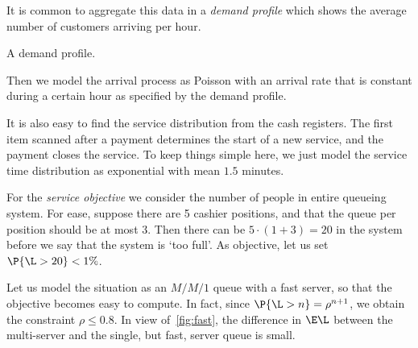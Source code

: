 It is common to aggregate this data in a \emph{demand profile} which shows the average number of customers arriving per hour.
\begin{marginfigure}
\caption{A demand profile.}
\label{fig:loadprofile}
\end{marginfigure}
Then we model the arrival process as Poisson with an arrival rate that is constant during a certain hour as specified by the demand profile.



It is also easy to find the service distribution from the cash registers.
The first item scanned after a payment determines the start of a new service, and the payment closes the service.
To keep things simple here, we just model the service time distribution as exponential with mean $1.5$ minutes.

For the \emph{service objective} we consider the number of people in entire queueing system.
For ease, suppose there are 5 cashier positions, and that the queue per position should be at most 3.
Then there can be $5\cdot (1 + 3) = 20$ in the system before we say that the system is `too full'. As objective, let us set $\P{\L>20} < 1\%$.

Let us model the situation as an $M/M/1$ queue with a fast server, so that the objective becomes easy to compute.
In fact, since $\P{\L>n} = \rho^{n+1}$, we obtain the constraint $\rho\leq 0.8$.
In view of~\cref{fig:fast}, the difference in $\E \L$ between the multi-server and the single, but fast, server queue is small.


